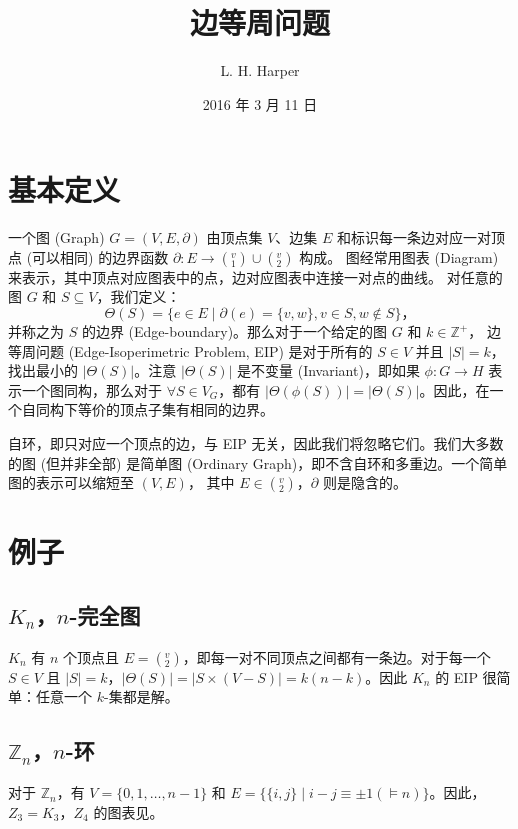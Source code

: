 \documentclass{article}
\author{L. H. Harper}
\date{2016 年 3 月 11 日}
\begin{document}
\title{边等周问题}
\maketitle

\section{基本定义}
\label{Section 1}

一个图 (Graph) $G = (V, E, \partial)$ 由顶点集 $V$、边集 $E$ 和标识每一条边对应一对顶点
(可以相同) 的边界函数 $\partial \colon E \rightarrow (_1^v) \cup (_2^v)$ 构成。
图经常用图表 (Diagram) 来表示，其中顶点对应图表中的点，边对应图表中连接一对点的曲线。
对任意的图 $G$ 和 $S \subseteq V$，我们定义：
$$\Theta(S) = \{e \in E \mid \partial(e) = \{v, w\}, v \in S, w \notin S\}，$$
并称之为 $S$ 的边界 (Edge-boundary)。那么对于一个给定的图 $G$ 和 $k \in \mathbb{Z}^+$，
边等周问题 (Edge-Isoperimetric Problem, EIP) 是对于所有的 $S \in V$ 并且 $|S| = k$，
找出最小的 $|\Theta(S)|$。注意 $|\Theta(S)|$ 是不变量 (Invariant)，即如果
$\phi \colon G \rightarrow H$ 表示一个图同构，那么对于 $\forall S \in V_G$，都有
$|\Theta(\phi(S))| = |\Theta(S)|$。因此，在一个自同构下等价的顶点子集有相同的边界。

自环，即只对应一个顶点的边，与 EIP 无关，因此我们将忽略它们。我们大多数的图 (但并非全部)
是简单图 (Ordinary Graph)，即不含自环和多重边。一个简单图的表示可以缩短至 $(V, E)$，
其中 $E \in (_2^v)$，$\partial$ 则是隐含的。

\section{例子}
\label{Section 2}

\subsection{$K_n$，$n$-完全图}
\label{Subsection 2.1}

$K_n$ 有 $n$ 个顶点且 $E = (_2^v)$，即每一对不同顶点之间都有一条边。对于每一个 $S \in V$
且 $|S| = k$，$|\Theta(S)| = |S \times (V − S)| = k(n − k)$。因此 $K_n$ 的 EIP
很简单：任意一个 $k$-集都是解。

\subsection{$\mathbb{Z}_n$，$n$-环}
\label{Subsection 2.2}

对于 $\mathbb{Z}_n$，有 $V = \{0, 1, \dots, n − 1\}$ 和
$E = \{\{i, j\} \mid i − j \equiv  \pm 1(\models n)\}$。因此，$Z_3 = K_3$，$Z_4$
的图表见。
\end{document}
